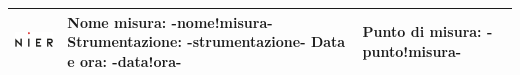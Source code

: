 \documentclass[11pt]{article}
\begin{document}


\begin{center}

 \begin{tabular}{| >{\centering\arraybackslash}m{} | m{} | >{\centering\arraybackslash}m{} |}

 \hline
    \begin{minipage}{.25\textwidth}
	\centering
      \includegraphics[width=3cm, height=10mm]{-logo-.png}
    \end{minipage}   
    & \vspace{0.1cm} \textbf{Nome misura}: -nome!misura-  \newline \textbf{Strumentazione}: -strumentazione-
 \newline \textbf{Data e ora}: -data!ora- \vspace{0.1cm} & {\large\textbf{Punto di misura: -punto!misura-}} \\
 
 \hline
\end{tabular}
\end{center}
\end{document}
